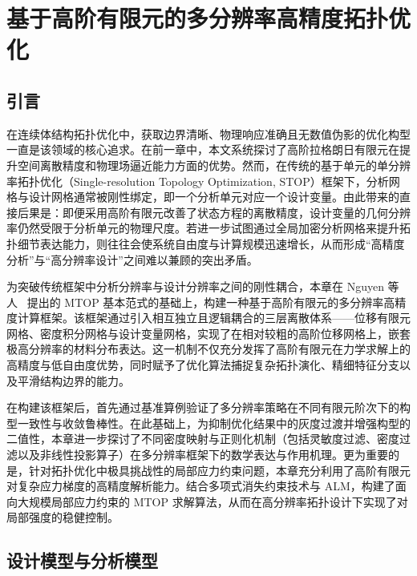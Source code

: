 \chapter{基于高阶有限元的多分辨率高精度拓扑优化}
\label{chap:high_fem_mtop}


\section{引言}
\label{sec:ch4_intro}

在连续体结构拓扑优化中，获取边界清晰、物理响应准确且无数值伪影的优化构型一直是该领域的核心追求。在前一章中，本文系统探讨了高阶拉格朗日有限元在提升空间离散精度和物理场逼近能力方面的优势。然而，在传统的基于单元的单分辨率拓扑优化（Single-resolution Topology Optimization, STOP）框架下，分析网格与设计网格通常被刚性绑定，即一个分析单元对应一个设计变量。由此带来的直接后果是：即便采用高阶有限元改善了状态方程的离散精度，设计变量的几何分辨率仍然受限于分析单元的物理尺度。若进一步试图通过全局加密分析网格来提升拓扑细节表达能力，则往往会使系统自由度与计算规模迅速增长，从而形成“高精度分析”与“高分辨率设计”之间难以兼顾的突出矛盾。

为突破传统框架中分析分辨率与设计分辨率之间的刚性耦合，本章在 Nguyen 等人~\cite{nguyenComputationalParadigmMultiresolution2010a} 提出的 MTOP 基本范式的基础上，构建一种基于高阶有限元的多分辨率高精度计算框架。该框架通过引入相互独立且逻辑耦合的三层离散体系——位移有限元网格、密度积分网格与设计变量网格，实现了在相对较粗的高阶位移网格上，嵌套极高分辨率的材料分布表达。这一机制不仅充分发挥了高阶有限元在力学求解上的高精度与低自由度优势，同时赋予了优化算法捕捉复杂拓扑演化、精细特征分支以及平滑结构边界的能力。

在构建该框架后，首先通过基准算例验证了多分辨率策略在不同有限元阶次下的构型一致性与收敛鲁棒性。在此基础上，为抑制优化结果中的灰度过渡并增强构型的二值性，本章进一步探讨了不同密度映射与正则化机制（包括灵敏度过滤、密度过滤以及非线性投影算子）在多分辨率框架下的数学表达与作用机理。更为重要的是，针对拓扑优化中极具挑战性的局部应力约束问题，本章充分利用了高阶有限元对复杂应力梯度的高精度解析能力。结合多项式消失约束技术与 ALM，构建了面向大规模局部应力约束的 MTOP 求解算法，从而在高分辨率拓扑设计下实现了对局部强度的稳健控制。


\section{设计模型与分析模型}
\label{sec:design_analysis_model}

